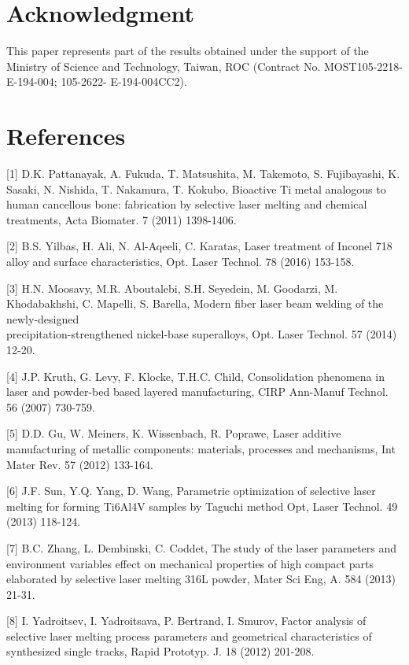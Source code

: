 \documentclass[10pt]{article}
\begin{document}
\section*{Acknowledgment}
This paper represents part of the results obtained under the support of the Ministry of Science and Technology, Taiwan, ROC (Contract No. MOST105-2218-E-194-004; 105-2622- E-194-004CC2).

\section*{References}
[1] D.K. Pattanayak, A. Fukuda, T. Matsushita, M. Takemoto, S. Fujibayashi, K. Sasaki, N. Nishida, T. Nakamura, T. Kokubo, Bioactive Ti metal analogous to human cancellous bone: fabrication by selective laser melting and chemical treatments, Acta Biomater. 7 (2011) 1398-1406.

[2] B.S. Yilbas, H. Ali, N. Al-Aqeeli, C. Karatas, Laser treatment of Inconel 718 alloy and surface characteristics, Opt. Laser Technol. 78 (2016) 153-158.

[3] H.N. Moosavy, M.R. Aboutalebi, S.H. Seyedein, M. Goodarzi, M. Khodabakhshi, C. Mapelli, S. Barella, Modern fiber laser beam welding of the newly-designed\\
precipitation-strengthened nickel-base superalloys, Opt. Laser Technol. 57 (2014) 12-20.

[4] J.P. Kruth, G. Levy, F. Klocke, T.H.C. Child, Consolidation phenomena in laser and powder-bed based layered manufacturing, CIRP Ann-Manuf Technol. 56 (2007) 730-759.

[5] D.D. Gu, W. Meiners, K. Wissenbach, R. Poprawe, Laser additive manufacturing of metallic components: materials, processes and mechanisms, Int Mater Rev. 57 (2012) 133-164.

[6] J.F. Sun, Y.Q. Yang, D. Wang, Parametric optimization of selective laser melting for forming Ti6Al4V samples by Taguchi method Opt, Laser Technol. 49 (2013) 118-124.

[7] B.C. Zhang, L. Dembinski, C. Coddet, The study of the laser parameters and environment variables effect on mechanical properties of high compact parts elaborated by selective laser melting 316L powder, Mater Sci Eng, A. 584 (2013) 21-31.

[8] I. Yadroitsev, I. Yadroitsava, P. Bertrand, I. Smurov, Factor analysis of selective laser melting process parameters and geometrical characteristics of synthesized single tracks, Rapid Prototyp. J. 18 (2012) 201-208.
\end{document}
